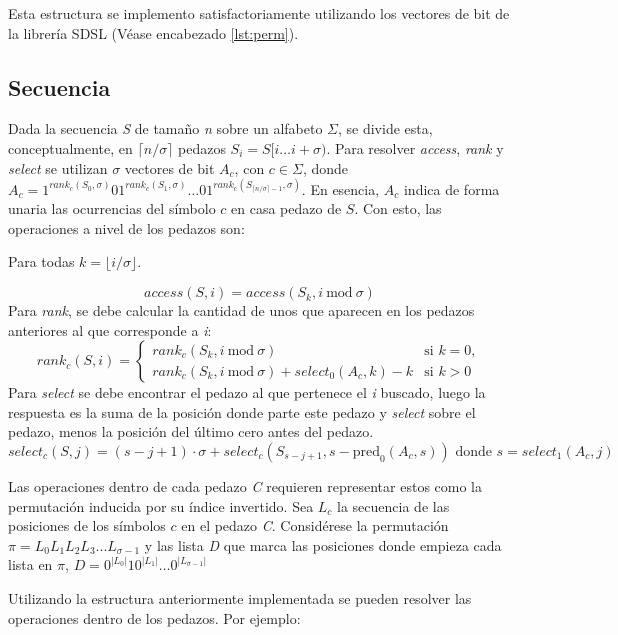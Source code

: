 Esta estructura se implemento satisfactoriamente utilizando los vectores de bit de la librería SDSL\cite{sdsl-lite} (Véase encabezado \ref{lst:perm}).

\subsection{Secuencia}

Dada la secuencia \textit{S} de tamaño \textit{n} sobre un alfabeto $\Sigma$, se divide esta, conceptualmente, en $\lceil n /\sigma \rceil$ pedazos $S_i = S[i \dots i+\sigma)$. Para resolver \textit{access}, \textit{rank} y \textit{select} se utilizan $\sigma$ vectores de bit $A_c$, con $c \in \Sigma$, donde $A_c = 1^{ rank_{c}(S_0, \sigma) } 0 1^{rank_{c}(S_1, \sigma)} \dots 0 1^{rank_{c}(S_{\lceil n /\sigma \rceil - 1}, \sigma)} $. En esencia, $A_c$ indica de forma unaria las ocurrencias del símbolo $c$ en casa pedazo de $S$. Con esto, las operaciones a nivel de los pedazos son:

Para todas $k = \lfloor i / \sigma \rfloor $.

\[ 
access(S, i) = access(S_k, i \ \text{mod} \ \sigma) 
\]
Para \textit{rank}, se debe calcular la cantidad de unos que aparecen en los pedazos anteriores al que corresponde a \textit{i}:
\[ 
rank_{c}(S, i) = 
\begin{cases} 
rank_{c}(S_k, i \ \text{mod} \ \sigma) & \text{si } k = 0,\\
rank_{c}(S_k, i \ \text{mod} \ \sigma) + select_{0}(A_{c}, k) - k & \text{si } k > 0
\end{cases} \]
Para \textit{select} se debe encontrar el pedazo al que pertenece el \textit{i} buscado, luego la respuesta es la suma de la posición donde parte este pedazo y \textit{select} sobre el pedazo, menos la posición del último cero antes del pedazo.
\[
select_{c}(S, j) = 
(s-j+1) \cdot \sigma +
select_{c}(S_{s-j+1}, s - \text{pred}_{0}(A_{c}, s)) \text{ donde } s = select_{1}(A_{c},j)
\]

Las operaciones dentro de cada pedazo \textit{C} requieren representar estos como la permutación inducida por su índice invertido. Sea $L_c$ la secuencia de las posiciones de los símbolos $c$ en el pedazo \textit{C}. Considérese la permutación $\pi = L_0 L_1 L_2 L_3 ... L_{\sigma-1}$ y las lista \textit{D} que marca las posiciones donde empieza cada lista en $\pi$, $D = 0^{|L_{0}|}10^{|L_{1}|} \dots 0^{|L_{\sigma-1}|}$

Utilizando la estructura anteriormente implementada se pueden resolver las operaciones dentro de los pedazos. Por ejemplo:

